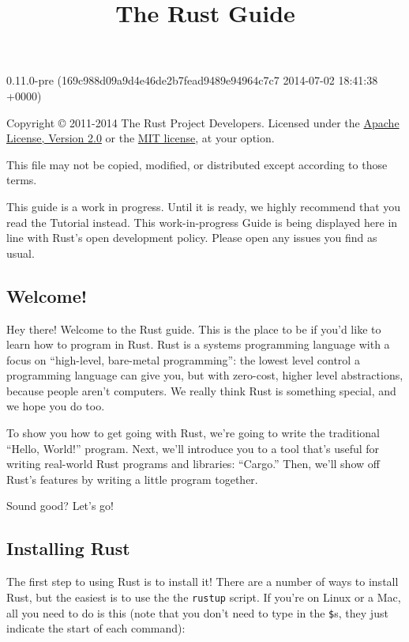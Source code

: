 \documentclass[]{article}
\title{The Rust Guide}
\begin{document}
\maketitle

0.11.0-pre (169c988d09a9d4e46de2b7fead9489e94964c7c7 2014-07-02 18:41:38 +0000)

Copyright © 2011-2014 The Rust Project Developers. Licensed under the
\href{http://www.apache.org/licenses/LICENSE-2.0}{Apache License,
Version 2.0} or the \href{http://opensource.org/licenses/MIT}{MIT
license}, at your option.

This file may not be copied, modified, or distributed except according
to those terms.

{
\hypersetup{linkcolor=black}
\setcounter{tocdepth}{3}
\tableofcontents
}
This guide is a work in progress. Until it is ready, we highly recommend
that you read the Tutorial instead. This work-in-progress Guide is being
displayed here in line with Rust's open development policy. Please open
any issues you find as usual.

\subsection{Welcome!}\label{welcome}

Hey there! Welcome to the Rust guide. This is the place to be if you'd
like to learn how to program in Rust. Rust is a systems programming
language with a focus on ``high-level, bare-metal programming'': the
lowest level control a programming language can give you, but with
zero-cost, higher level abstractions, because people aren't computers.
We really think Rust is something special, and we hope you do too.

To show you how to get going with Rust, we're going to write the
traditional ``Hello, World!'' program. Next, we'll introduce you to a
tool that's useful for writing real-world Rust programs and libraries:
``Cargo.'' Then, we'll show off Rust's features by writing a little
program together.

Sound good? Let's go!

\subsection{Installing Rust}\label{installing-rust}

The first step to using Rust is to install it! There are a number of
ways to install Rust, but the easiest is to use the the \texttt{rustup}
script. If you're on Linux or a Mac, all you need to do is this (note
that you don't need to type in the \texttt{\$}s, they just indicate the
start of each command):
\end{document}

